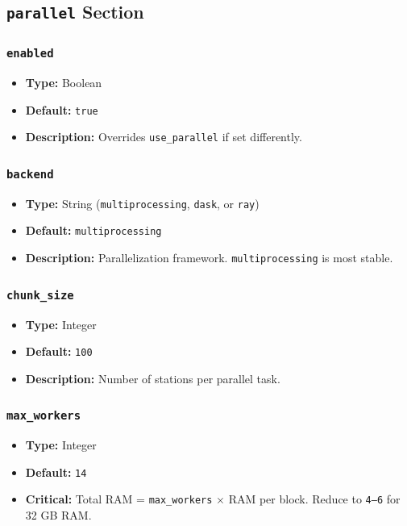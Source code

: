 \documentclass[12pt,a4paper]{article}
\begin{document}
\subsection{\texttt{parallel} Section}
\subsubsection{\texttt{enabled}}
\begin{itemize}[leftmargin=*]
    \item \textbf{Type:} Boolean
    \item \textbf{Default:} \texttt{true}
    \item \textbf{Description:} Overrides \texttt{use\_parallel} if set differently.
\end{itemize}
\subsubsection{\texttt{backend}}
\begin{itemize}[leftmargin=*]
    \item \textbf{Type:} String (\texttt{multiprocessing}, \texttt{dask}, or \texttt{ray})
    \item \textbf{Default:} \texttt{multiprocessing}
    \item \textbf{Description:} Parallelization framework. \texttt{multiprocessing} is most stable.
\end{itemize}
\subsubsection{\texttt{chunk\_size}}
\begin{itemize}[leftmargin=*]
    \item \textbf{Type:} Integer
    \item \textbf{Default:} \texttt{100}
    \item \textbf{Description:} Number of stations per parallel task.
\end{itemize}
\subsubsection{\texttt{max\_workers}}
\begin{itemize}[leftmargin=*]
    \item \textbf{Type:} Integer
    \item \textbf{Default:} \texttt{14}
    \item \textbf{Critical:} Total RAM = \texttt{max\_workers} \(\times\) RAM per block. Reduce to \texttt{4--6} for 32 GB RAM.
\end{itemize}
\end{document}
